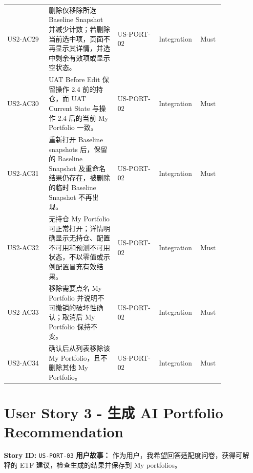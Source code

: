 \begin{longtable}{L{0.18\linewidth}L{0.30\linewidth}L{0.18\linewidth}L{0.12\linewidth}L{0.10\linewidth}}
US2-AC29 & 删除仅移除所选 Baseline Snapshot 并减少计数；若删除当前选中项，页面不再显示其详情，并选中剩余有效项或显示空状态。 & US-PORT-02 & Integration & Must \\
US2-AC30 & UAT Before Edit 保留操作 2.4 前的持仓，而 UAT Current State 与操作 2.4 后的当前 My Portfolio 一致。 & US-PORT-02 & Integration & Must \\
US2-AC31 & 重新打开 Baseline snapshots 后，保留的 Baseline Snapshot 及重命名结果仍存在，被删除的临时 Baseline Snapshot 不再出现。 & US-PORT-02 & Integration & Must \\
US2-AC32 & 无持仓 My Portfolio 可正常打开；详情明确显示无持仓、配置不可用和预测不可用状态，不以零值或示例配置冒充有效结果。 & US-PORT-02 & Integration & Must \\
US2-AC33 & 移除需要点名 My Portfolio 并说明不可撤销的破坏性确认；取消后 My Portfolio 保持不变。 & US-PORT-02 & Integration & Must \\
US2-AC34 & 确认后从列表移除该 My Portfolio，且不删除其他 My Portfolio。 & US-PORT-02 & Integration & Must \\
\bottomrule
\end{longtable}
\endgroup
\prdhr
\hypertarget{us-port-03}{}
\section{User Story 3 - 生成 AI Portfolio Recommendation}
\textbf{Story ID:} \texttt{US-PORT-03}
\textbf{用户故事：} 作为用户，我希望回答适配度问卷，获得可解释的 ETF 建议，检查生成的结果并保存到 My portfolios。
